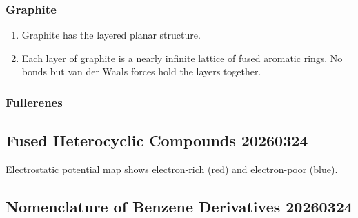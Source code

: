 \subsubsection{Graphite}

\begin{enumerate}
    \item Graphite has the layered planar structure.
    \item Each layer of graphite is a nearly infinite lattice of fused aromatic rings. No bonds but van der Waals forces hold the layers together.
\end{enumerate}

\subsubsection{Fullerenes}

\subsection{Fused Heterocyclic Compounds 20260324}

Electrostatic potential map shows electron-rich (red) and electron-poor (blue).

\subsection{Nomenclature of Benzene Derivatives 20260324}

